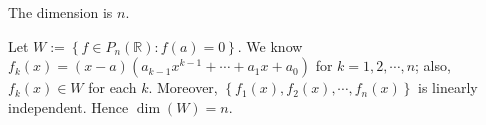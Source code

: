 \begin{Exercise}
	\begin{answer}
		The dimension is $n$.
	\end{answer}
	\begin{solution}
		Let $W := \left\{ f\in P_n(\mathbb{R}): f(a) = 0 \right\}$. We know $f_k(x) = (x-a)(a_{k-1}x^{k-1}+\cdots+a_1 x+a_0)$ for $k=1,2,\cdots,n$; also, $f_k(x)\in W$ for each $k$. Moreover, $\left\{ f_1(x), f_2(x), \cdots, f_n(x) \right\}$ is linearly independent. Hence $\dim(W) = n$.
	\end{solution}
\end{Exercise}